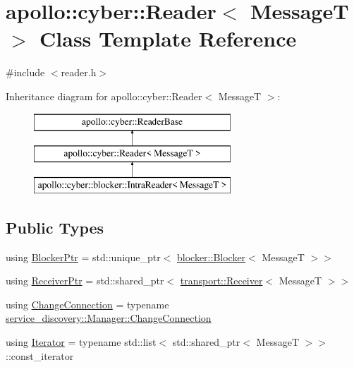 \hypertarget{classapollo_1_1cyber_1_1Reader}{\section{apollo\-:\-:cyber\-:\-:Reader$<$ Message\-T $>$ Class Template Reference}
\label{classapollo_1_1cyber_1_1Reader}
}


{\ttfamily \#include $<$reader.\-h$>$}

Inheritance diagram for apollo\-:\-:cyber\-:\-:Reader$<$ Message\-T $>$\-:\begin{figure}[H]
\begin{center}
\leavevmode
\includegraphics[height=3.000000cm]{classapollo_1_1cyber_1_1Reader}
\end{center}
\end{figure}
\subsection*{Public Types}
\begin{DoxyCompactItemize}
\item 
using \hyperlink{classapollo_1_1cyber_1_1Reader_a44a6c385712936a5d4eaaa1920d05013}{Blocker\-Ptr} = std\-::unique\-\_\-ptr$<$ \hyperlink{classapollo_1_1cyber_1_1blocker_1_1Blocker}{blocker\-::\-Blocker}$<$ Message\-T $>$$>$
\item 
using \hyperlink{classapollo_1_1cyber_1_1Reader_a7c76533ce5c8e13f5382248ae2059aad}{Receiver\-Ptr} = std\-::shared\-\_\-ptr$<$ \hyperlink{classapollo_1_1cyber_1_1transport_1_1Receiver}{transport\-::\-Receiver}$<$ Message\-T $>$$>$
\item 
using \hyperlink{classapollo_1_1cyber_1_1Reader_a1bb84e1881d6df00cd3b8fc669b606b4}{Change\-Connection} = typename \hyperlink{classapollo_1_1cyber_1_1service__discovery_1_1Manager_ab43fa282f6aa1b3b1180a1e416b98b68}{service\-\_\-discovery\-::\-Manager\-::\-Change\-Connection}
\item 
using \hyperlink{classapollo_1_1cyber_1_1Reader_a54b26f524fb24d2b90fc9fb6fa908bf3}{Iterator} = typename std\-::list$<$ std\-::shared\-\_\-ptr$<$ Message\-T $>$$>$\-::const\-\_\-iterator
\end{DoxyCompactItemize}
